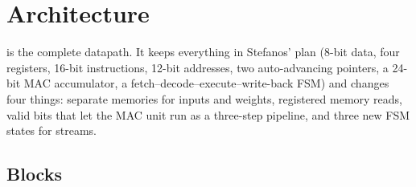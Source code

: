\section{Architecture}\label{sec:arch}

 is the complete datapath. It keeps everything in Stefanos' plan (8-bit data, four registers, 16-bit instructions, 12-bit addresses, two auto-advancing pointers, a 24-bit MAC accumulator, a fetch--decode--execute--write-back FSM) and changes four things: separate memories for inputs and weights, registered memory reads, valid bits that let the MAC unit run as a three-step pipeline, and three new FSM states for streams.


\subsection{Blocks}

